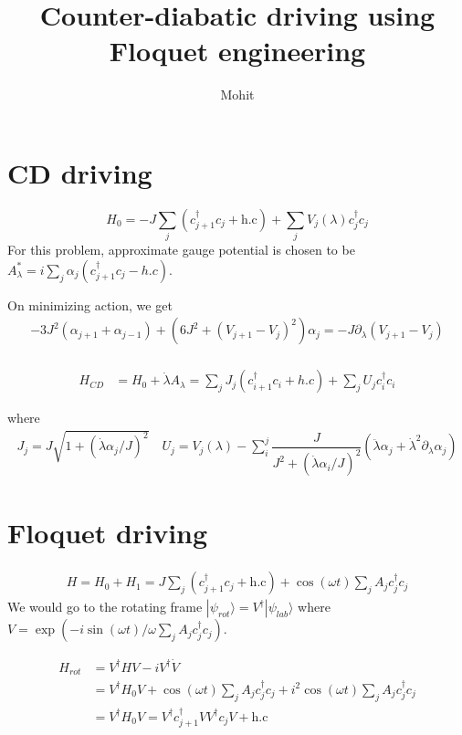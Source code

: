 \documentclass[11pt,a4paper]{article}
\author{Mohit}
\title{Counter-diabatic driving using Floquet engineering}
\begin{document}
\maketitle

\section{CD driving}
 \begin{equation}
 H_0= - J \sum_j (c^{\dagger}_{j+1} c_j+ \mbox{h.c}) + \sum_j V_j (\lambda) c^{\dagger}_{j} c_j
 \end{equation}
For this problem, approximate gauge potential is chosen to be $A_{\lambda}^*= i \sum_j \alpha_j (c^{\dagger}_{j+1} c_j- h.c)$.

On minimizing action, we get 
\begin{align*}
-3 J^2 (\alpha_{j+1}+ \alpha_{j-1})+ (6 J^2 + (V_{j+1}- V_{j})^2) \alpha_j= - J \partial_{\lambda} (V_{j+1}- V_{j}) \\
\end{align*}

\begin{align*}
H_{CD}&= H_0 + \dot{\lambda} A_{\lambda}=  \sum_j J_j (c^{\dagger}_{i+1} c_i+ h.c) + \sum_j U_j  c^{\dagger}_{i} c_i
\end{align*}

where 
\begin{align*}
J_j= J \sqrt{1 + (\dot{\lambda} \alpha_j/J)^2} \quad U_j = V_j( \lambda) - \sum_i^j \dfrac{J}{J^2 + (\dot{\lambda} \alpha_i/J)^2} (\ddot{\lambda} \alpha_j + \dot{\lambda}^2 \partial_{\lambda} \alpha_j)
\end{align*}



\section{Floquet driving}

\begin{align*}
H = H_0 + H_1 = J\sum_j (c_{j+1}^{\dagger} c_j  + \mbox{h.c}) + \cos(\omega t) \sum_j A_j  c_j^{\dagger} c_j
\end{align*}
We would go to the rotating frame $|\psi_{rot} \rangle= V^{\dagger}|\psi_{lab} \rangle$
where $V=\exp(-i \sin(\omega t)/ \omega \sum_j A_j  c_j^{\dagger} c_j)$.

\begin{align*}
H_{rot}&= V^{\dagger} H V- i V^{\dagger} \dot{V}\\
&=V^{\dagger} H_0 V + \cos(\omega t) \sum_j A_j  c_j^{\dagger} c_j + i^2 \cos(\omega t) \sum_j A_j  c_j^{\dagger} c_j \\
&=V^{\dagger} H_0 V =V^{\dagger} c_{j+1}^{\dagger}V V^{\dagger} c_j V  + \mbox{h.c}
\end{align*}
\end{document}

